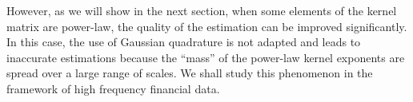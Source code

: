 \documentclass[a4paper,11pt]{article}
\newtheorem{proposition}{Proposition}[section]
\begin{document}
\noindent However, as we will show in the next section, when some elements of the kernel matrix are power-law, the quality of the estimation can be improved significantly. In this case, the use of Gaussian quadrature is not adapted and leads to inaccurate estimations because the ``mass'' of the power-law kernel exponents are spread over a large range of scales.
We shall study this phenomenon in the framework of high frequency financial data.





\end{document}
